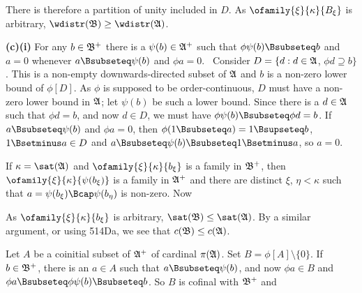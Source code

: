 {There is therefore a partition of unity included in $D$.   As
$\ofamily{\xi}{\kappa}{B_{\xi}}$ is arbitrary,
$\wdistr(\frak B)\ge\wdistr(\frak A)$.

\medskip

{\bf (c)(i)} For any $b\in\frak B^+$ there is a $\psi(b)\in\frak A^+$ such
that $\phi\psi(b)\Bsubseteq b$ and $a=0$ whenever
$a\Bsubseteq\psi(b)$ and $\phi a=0$.   \Prf\ Consider
$D=\{d:d\in\frak A$, $\phi d\supseteq b\}$.   This is a
non-empty downwards-directed subset of $\frak A$ and $b$ is a non-zero
lower bound of $\phi[D]$.   As $\phi$ is supposed to be order-continuous,
$D$ must have a non-zero lower bound in $\frak A$;  let $\psi(b)$ be such a
lower bound.   Since there is a $d\in\frak A$ such that $\phi d=b$, and now
$d\in D$, we must have $\phi\psi(b)\Bsubseteq\phi d=b$.   If
$a\Bsubseteq\psi(b)$ and $\phi a=0$, then
$\phi(1\Bsubseteq a)=1\Bsupseteq b$, $1\Bsetminus a\in D$ and
$a\Bsubseteq\psi(b)\Bsubseteq 1\Bsetminus a$, so $a=0$.\ \Qed

\medskip

 If $\kappa=\sat(\frak A)$ and
$\ofamily{\xi}{\kappa}{b_{\xi}}$ is a family in $\frak B^+$, then
$\ofamily{\xi}{\kappa}{\psi(b_{\xi})}$ is a family in $\frak A^+$ and there
are distinct $\xi$, $\eta<\kappa$ such that
$a=\psi(b_{\xi})\Bcap\psi(b_{\eta})$ is non-zero.   Now


\noindent As $\ofamily{\xi}{\kappa}{b_{\xi}}$ is arbitrary,
$\sat(\frak B)\le\sat(\frak A)$.   By a similar argument, or using 514Da,
we see that $c(\frak B)\le c(\frak A)$.

\medskip

 Let $A$ be a coinitial subset of $\frak A^+$ of
cardinal $\pi(\frak A)$.   Set $B=\phi[A]\setminus\{0\}$.   If
$b\in\frak B^+$, there is an $a\in A$ such that $a\Bsubseteq\psi(b)$, and
now $\phi a\in B$ and $\phi a\Bsubseteq\phi\psi(b)\Bsubseteq b$.   So $B$
is cofinal with $\frak B^+$ and


\medskip

}
